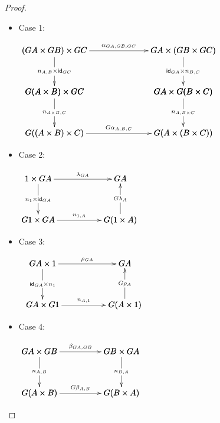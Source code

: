 \begin{proof}
  \begin{itemize}
  \item[] Case 1:
    \begin{center}
      \begin{math}
        \bfig
        \vSquares|ammmmma|/->`->`->``->`->`->/[
          (GA \times GB) \times GC`
          GA \times (GB \times GC)`
          G(A \times B) \times GC`
          GA \times G(B \times C)`
          G((A \times B) \times C)`
          G(A \times (B \times C));
          {\alpha}_{GA,GB,GC}`
          n_{A,B} \times \id_{GC}`
          \id_{GA} \times n_{B,C}``
          n_{A \times B,C}`
          n_{A,B \times C}`
          G{\alpha}_{A,B,C}]
        \efig
      \end{math}
    \end{center}

  \item[] Case 2:
    \begin{center}
      \begin{math}
        \bfig
        \square|amma|/->`->`<-`->/<1000,500>[
          1 \times GA`
          GA`
          G1 \times GA`
          G(1 \times A);
          {\lambda}_{GA}`
          n_{1} \times \id_{GA}`
          G{\lambda}_{A}`
          n_{1,A}]
        \efig
      \end{math}
    \end{center}

  \item[] Case 3:
    \begin{center}
      \begin{math}
        \begin{array}{lll}
          \bfig
          \square|amma|/->`->`<-`->/<1000,500>[
            GA \times 1`
            GA`
            GA \times G1`
            G(A \times 1);
            {\rho}_{GA}`
            \id_{GA} \times n_{1}`
            G{\rho}_{A}`
            n_{A,1}]
          \efig
        \end{array}
      \end{math}
    \end{center}

  \item[] Case 4:
    \begin{center}
      \begin{math}
        \bfig
        \square|amma|/->`->`->`->/<1000,500>[
          GA \times GB`
          GB \times GA`
          G(A \times B)`
          G(B \times A);
          {\beta}_{GA,GB}`
          n_{A,B}`
          n_{B,A}`
          G{\beta}_{A,B}]
        \efig
      \end{math}
    \end{center}
  \end{itemize}
\end{proof}
